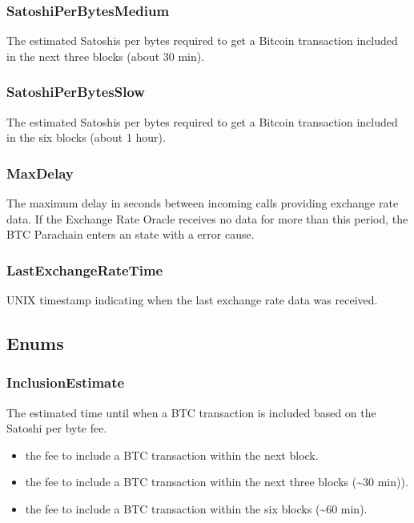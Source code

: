 \documentclass[a4paper,10pt,english]{sphinxmanual}
\begin{document}
\subsubsection{SatoshiPerBytesMedium}
\label{\detokenize{spec/oracle:satoshiperbytesmedium}}
The estimated Satoshis per bytes required to get a Bitcoin transaction included in the next three blocks (about 30 min).


\subsubsection{SatoshiPerBytesSlow}
\label{\detokenize{spec/oracle:satoshiperbytesslow}}
The estimated Satoshis per bytes required to get a Bitcoin transaction included in the six blocks (about 1 hour).


\subsubsection{MaxDelay}
\label{\detokenize{spec/oracle:maxdelay}}
The maximum delay in seconds between incoming calls providing exchange rate data. If the Exchange Rate Oracle receives no data for more than this period, the BTC Parachain enters an  state with a  error cause.


\subsubsection{LastExchangeRateTime}
\label{\detokenize{spec/oracle:lastexchangeratetime}}
UNIX timestamp indicating when the last exchange rate data was received.


\subsection{Enums}
\label{\detokenize{spec/oracle:enums}}

\subsubsection{InclusionEstimate}
\label{\detokenize{spec/oracle:inclusionestimate}}
The estimated time until when a BTC transaction is included based on the Satoshi per byte fee.
\begin{itemize}
\item {} 
 \sphinxhyphen{} the fee to include a BTC transaction within the next block.

\item {} 
\sphinxhyphen{} the fee to include a BTC transaction within the next three blocks (\textasciitilde{}30 min)).

\item {} 
 \sphinxhyphen{} the fee to include a BTC transaction within the six blocks  (\textasciitilde{}60 min).

\end{itemize}
\end{document}
